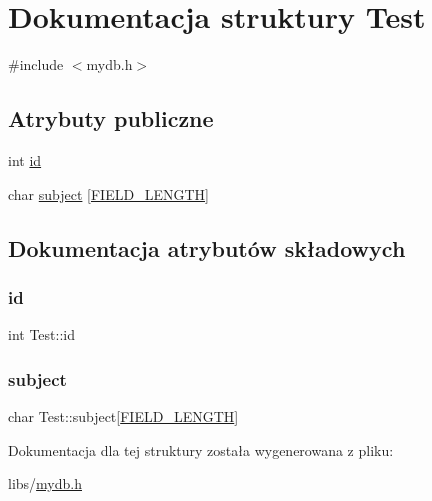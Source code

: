\hypertarget{structTest}{}\section{Dokumentacja struktury Test}
\label{structTest}


{\ttfamily \#include $<$mydb.\+h$>$}

\subsection*{Atrybuty publiczne}
\begin{DoxyCompactItemize}
\item 
int \mbox{\hyperlink{structTest_a5c2d3170a5825bbd6adf832adff6a8ef}{id}}
\item 
char \mbox{\hyperlink{structTest_a08311b2f79e3d7ed9c57f4db5b05de4a}{subject}} \mbox{[}\mbox{\hyperlink{mydb_8h_a4e8ecaf2d59499a8c159ccdf7be1baec}{F\+I\+E\+L\+D\+\_\+\+L\+E\+N\+G\+TH}}\mbox{]}
\end{DoxyCompactItemize}


\subsection{Dokumentacja atrybutów składowych}
\mbox{\label{structTest_a5c2d3170a5825bbd6adf832adff6a8ef}} 
\subsubsection{\texorpdfstring{id}{id}}
{\footnotesize\ttfamily int Test\+::id}

\mbox{\label{structTest_a08311b2f79e3d7ed9c57f4db5b05de4a}} 
\subsubsection{\texorpdfstring{subject}{subject}}
{\footnotesize\ttfamily char Test\+::subject\mbox{[}\mbox{\hyperlink{mydb_8h_a4e8ecaf2d59499a8c159ccdf7be1baec}{F\+I\+E\+L\+D\+\_\+\+L\+E\+N\+G\+TH}}\mbox{]}}



Dokumentacja dla tej struktury została wygenerowana z pliku\+:\begin{DoxyCompactItemize}
\item 
libs/\mbox{\hyperlink{mydb_8h}{mydb.\+h}}\end{DoxyCompactItemize}
